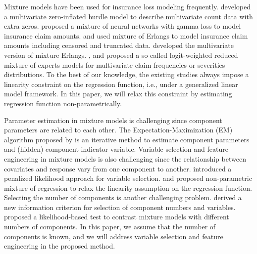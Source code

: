 \documentclass[11pt]{article}
\numberwithin{equation}{section}
\begin{document}
Mixture models have been used for insurance loss modeling frequently.
\citet{zhang2020type, zhang2022new} developed a multivariate zero-inflated hurdle model to describe multivariate count data with extra zeros.
\citet{delong2021gamma} proposed a mixture of neural networks with gamma loss to model insurance claim amounts.
\citet{lee2010modeling} and \citet{verbelen2015fitting} used mixture of Erlangs to model insurance claim amounts including censored and truncated data.
\citet{lee2012modeling} developed the multivariate version of mixture Erlangs.
\citet{fung2019class}, \citet{fung2019class2} and \citet{tseung2021lrmoe} proposed a so called logit-weighted reduced mixture of experts models for multivariate claim frequencies or severities distributions.
To the best of our knowledge, the existing studies always impose a linearity constraint on the regression function, i.e., under a generalized linear model framework.
In this paper, we will relax this constraint by estimating regression function non-parametrically.

Parameter estimation in mixture models is challenging since component parameters are related to each other. 
The Expectation-Maximization (EM) algorithm proposed by \citet{dempster1977maximum} is an iterative method to estimate component parameters and (hidden) component indicator variable. 
Variable selection and feature engineering in mixture models  is also challenging since the relationship between covariates and response vary from one component to another.  
\citet{khalili2007variable} introduced a penalized likelihood approach for variable selection.
\citet{huang2012mixture} and \citet{huang2013nonparametric} proposed non-parametric mixture of regression to relax the linearity assumption on the regression function.
Selecting the number of components is another challenging problem.
\citet{naik2007extending} derived a new information criterion for selection of component numbers and variables.
\citet{kasahara2015testing} proposed a likelihood-based test to contrast mixture models with different numbers of components. 
In this paper, we assume that the number of components is known, and we will address variable selection and feature engineering in the proposed method.
\end{document}
